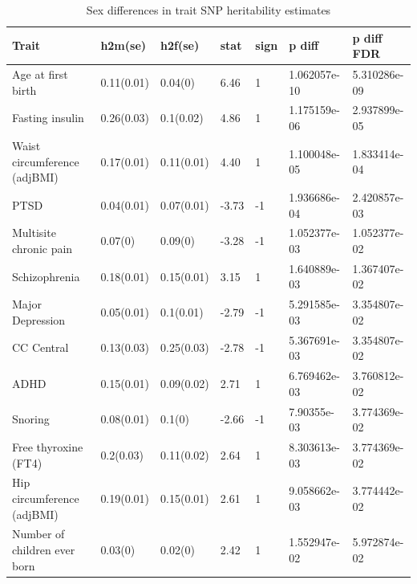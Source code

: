 \documentclass{article}\usepackage[]{graphicx}\usepackage[dvipsnames]{xcolor}
\begin{document}
\renewcommand{\arraystretch}{1.3}

% 
\setcounter{table}{0}
\renewcommand{\tablename}{Supplementary Table} %

\begin{longtable}{p{6cm}|p{1.5cm}|p{1.5cm}|p{1.5cm}|p{0.5cm}|p{3cm}|p{3cm}}
\caption{Sex differences in trait SNP heritability estimates}\\
  \hline
Trait & h2m(se) & h2f(se) & stat & sign & p diff & p diff FDR \\ 
  \hline
Age at first birth & 0.11(0.01) & 0.04(0) & 6.46 &   1 & 1.062057e-10 & 5.310286e-09 \\ 
  Fasting insulin & 0.26(0.03) & 0.1(0.02) & 4.86 &   1 & 1.175159e-06 & 2.937899e-05 \\ 
  Waist circumference (adjBMI) & 0.17(0.01) & 0.11(0.01) & 4.40 &   1 & 1.100048e-05 & 1.833414e-04 \\ 
  PTSD & 0.04(0.01) & 0.07(0.01) & -3.73 &  -1 & 1.936686e-04 & 2.420857e-03 \\ 
  Multisite chronic pain & 0.07(0) & 0.09(0) & -3.28 &  -1 & 1.052377e-03 & 1.052377e-02 \\ 
  Schizophrenia & 0.18(0.01) & 0.15(0.01) & 3.15 &   1 & 1.640889e-03 & 1.367407e-02 \\ 
  Major Depression & 0.05(0.01) & 0.1(0.01) & -2.79 &  -1 & 5.291585e-03 & 3.354807e-02 \\ 
  CC Central & 0.13(0.03) & 0.25(0.03) & -2.78 &  -1 & 5.367691e-03 & 3.354807e-02 \\ 
  ADHD & 0.15(0.01) & 0.09(0.02) & 2.71 &   1 & 6.769462e-03 & 3.760812e-02 \\ 
  Snoring & 0.08(0.01) & 0.1(0) & -2.66 &  -1 & 7.90355e-03 & 3.774369e-02 \\ 
  Free thyroxine (FT4) & 0.2(0.03) & 0.11(0.02) & 2.64 &   1 & 8.303613e-03 & 3.774369e-02 \\ 
  Hip circumference (adjBMI) & 0.19(0.01) & 0.15(0.01) & 2.61 &   1 & 9.058662e-03 & 3.774442e-02 \\ 
  Number of children ever born & 0.03(0) & 0.02(0) & 2.42 &   1 & 1.552947e-02 & 5.972874e-02 \\ 
   \hline
 \end{longtable}


 
\end{document}
